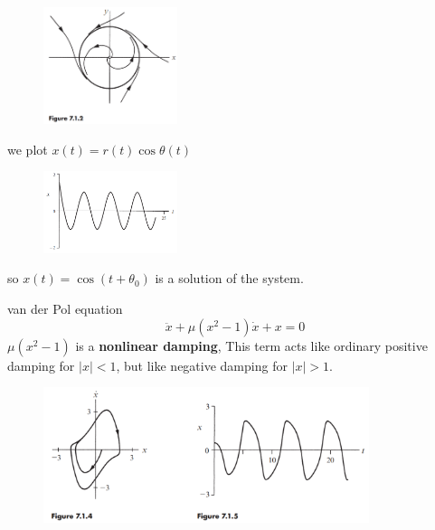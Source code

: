 \documentclass[9pt,aspectratio=43,mathserif,table]{beamer}
\begin{document}
\begin{frame}
	\begin{figure}
		\centering
		\includegraphics[width=0.35\textwidth]{fig712.jpg}
	\end{figure}

	we plot $x(t) = r(t)\cos\theta (t)$
	
	\begin{figure}
		\centering
		\includegraphics[width=0.35\textwidth]{fig713.jpg}
	\end{figure}

	so $x(t)=\cos(t + \theta_0)$ is a solution of the system.
\end{frame}

\begin{frame}{van der Pol equation}
	$$
	\ddot{x}+\mu \left( x^2-1 \right) \dot{x}+x=0
	$$
	$\mu \left( x^2-1 \right)$ is a \textbf{nonlinear damping}, This term acts like ordinary positive damping for $|x|< 1$, but like negative damping for $|x| > 1$.

	\begin{figure}
		\centering
		\includegraphics[width=0.85\textwidth]{fig714.jpg}
	\end{figure}

\end{frame}
\end{document}
